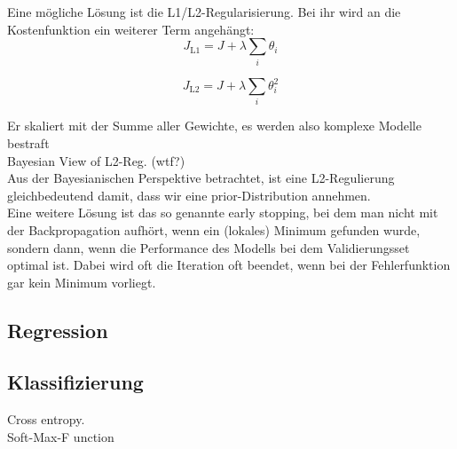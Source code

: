 Eine mögliche Lösung ist die L1/L2-Regularisierung. Bei ihr wird an die Kostenfunktion ein weiterer Term angehängt:\\

\begin{equation}
	J_{\text{L1}} = J + \lambda \sum_i \theta_i 
\end{equation}

\begin{equation}
	J_{\text{L2}} = J + \lambda \sum_i \theta_i^2
\end{equation}


Er skaliert mit der Summe aller Gewichte, es werden also komplexe Modelle bestraft 
\\Bayesian View of L2-Reg. (wtf?)\\

Aus der Bayesianischen Perspektive betrachtet, ist eine L2-Regulierung gleichbedeutend damit, dass wir eine prior-Distribution annehmen. \\
Eine weitere Lösung ist das so genannte early stopping, bei dem man nicht mit der Backpropagation aufhört, wenn ein (lokales) Minimum gefunden wurde, sondern dann, wenn die Performance des Modells bei dem Validierungsset optimal ist. Dabei wird oft die Iteration oft beendet, wenn bei der Fehlerfunktion gar kein Minimum vorliegt. 

\subsection{Regression}

\subsection{Klassifizierung}
Cross entropy.
\\
Soft-Max-F	unction
\\



